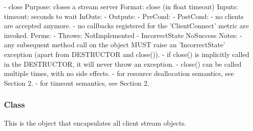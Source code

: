 \begin{myspec}
    - close
      Purpose:  closes a stream server
      Format:   close                (in float timeout)
      Inputs:   timeout:              seconds to wait
      InOuts:   -
      Outputs:  -
      PreCond:  - 
      PostCond: - no clients are accepted anymore.
                - no callbacks registered for the
                  'ClientConnect' metric are invoked.
      Perms:    -
      Throws:   NotImplemented
-               IncorrectState
                NoSuccess
      Notes:    - any subsequent method call on the object
                  MUST raise an 'IncorrectState' exception
                  (apart from DESTRUCTOR and close()).
                - if close() is implicitly called in the
                  DESTRUCTOR, it will never throw an exception.
                - close() can be called multiple times, with no
                  side effects.
                - for resource deallocation semantics, see 
                  Section 2.
                - for timeout semantics, see Section 2.
 \end{myspec}
 
 
  \subsubsection*{Class }
 
    This is the object that encapsulates all client stream
    objects.
 
